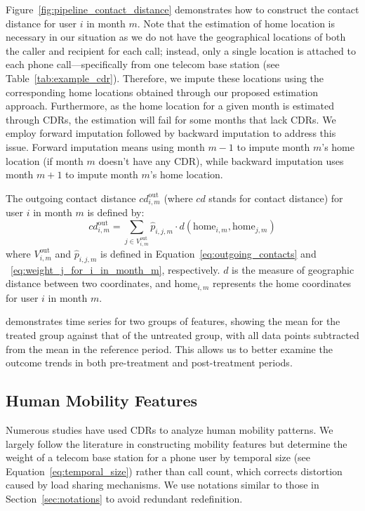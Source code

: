 Figure~\ref{fig:pipeline_contact_distance} demonstrates how to construct the contact distance for user $i$ in month $m$.
Note that the estimation of home location is necessary in our situation as we do not have the geographical locations of both the caller and recipient for each call; instead, only a single location is attached to each phone call---specifically from one telecom base station (see Table~\ref{tab:example_cdr}).
Therefore, we impute these locations using the corresponding home locations obtained through our proposed estimation approach.
Furthermore, as the home location for a given month is estimated through CDRs, the estimation will fail for some months that lack CDRs.
We employ forward imputation followed by backward imputation to address this issue. Forward imputation means using month $m-1$ to impute month $m$'s home location (if month $m$ doesn't have any CDR), while backward imputation uses month $m+1$ to impute month $m$'s home location.

\begin{definition}
The outgoing contact distance \( cd^{\text{out}}_{i, m} \) (where $cd$ stands for contact distance) for user $i$ in month $m$ is defined by:
\[
cd^{\text{out}}_{i, m}
=
\sum_{j \in V^{\text{out}}_{i, m} } \hat{p}_{i, j, m}
\cdot
d(\text{home}_{i, m}, \text{home}_{j, m})
\]
where $V^{\text{out}}_{i, m}$ and $\hat{p}_{i, j, m}$ is defined in Equation~\ref{eq:outgoing_contacts} and ~\ref{eq:weight_j_for_i_in_month_m}, respectively. $d$ is the measure of geographic distance between two coordinates, and $\text{home}_{i, m}$ represents the home coordinates for user $i$ in month $m$.
\end{definition}

 demonstrates time series for two groups of features, showing the mean for the treated group against that of the untreated group, with all data points subtracted from the mean in the reference period. This allows us to better examine the outcome trends in both pre-treatment and post-treatment periods.


\subsection{Human Mobility Features}
Numerous studies have used CDRs to analyze human mobility patterns. We largely follow the literature in constructing mobility features but determine the weight of a telecom base station for a phone user by temporal size (see Equation~\ref{eq:temporal_size}) rather than call count, which corrects distortion caused by load sharing mechanisms. We use notations similar to those in Section~\ref{sec:notations} to avoid redundant redefinition.

